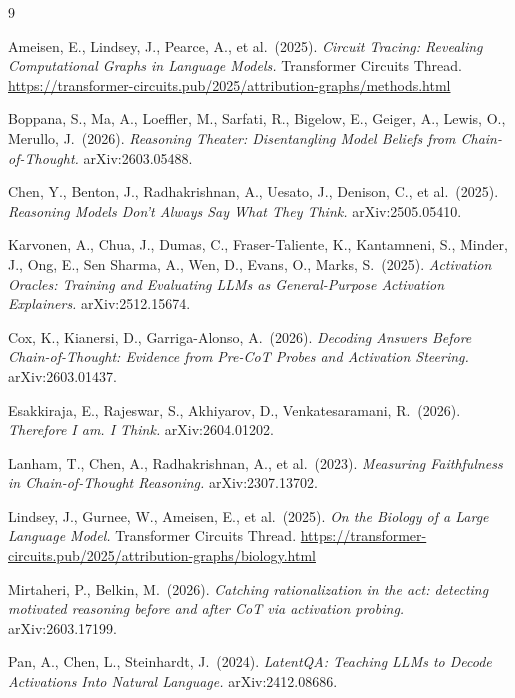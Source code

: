 \documentclass[11pt]{article}
\begin{document}
\begin{thebibliography}{9}

Ameisen, E., Lindsey, J., Pearce, A., et al.\ (2025).
\emph{Circuit Tracing: Revealing Computational Graphs in Language Models.}
Transformer Circuits Thread.
\url{https://transformer-circuits.pub/2025/attribution-graphs/methods.html}

Boppana, S., Ma, A., Loeffler, M., Sarfati, R., Bigelow, E., Geiger, A.,
Lewis, O., Merullo, J.\ (2026). \emph{Reasoning Theater: Disentangling
Model Beliefs from Chain-of-Thought.} arXiv:2603.05488.

Chen, Y., Benton, J., Radhakrishnan, A., Uesato, J., Denison, C., et al.\
(2025). \emph{Reasoning Models Don't Always Say What They Think.}
arXiv:2505.05410.

Karvonen, A., Chua, J., Dumas, C., Fraser-Taliente, K., Kantamneni, S.,
Minder, J., Ong, E., Sen Sharma, A., Wen, D., Evans, O., Marks, S.\
(2025). \emph{Activation Oracles: Training and Evaluating LLMs as
General-Purpose Activation Explainers.} arXiv:2512.15674.

Cox, K., Kianersi, D., Garriga-Alonso, A.\ (2026). \emph{Decoding
Answers Before Chain-of-Thought: Evidence from Pre-CoT Probes and
Activation Steering.} arXiv:2603.01437.

Esakkiraja, E., Rajeswar, S., Akhiyarov, D., Venkatesaramani, R.\ (2026).
\emph{Therefore I am. I Think.} arXiv:2604.01202.

Lanham, T., Chen, A., Radhakrishnan, A., et al.\ (2023).
\emph{Measuring Faithfulness in Chain-of-Thought Reasoning.}
arXiv:2307.13702.

Lindsey, J., Gurnee, W., Ameisen, E., et al.\ (2025).
\emph{On the Biology of a Large Language Model.}
Transformer Circuits Thread.
\url{https://transformer-circuits.pub/2025/attribution-graphs/biology.html}

\bibitem[Mirtaheri and Belkin(2026)]{mirtaheri}
Mirtaheri, P., Belkin, M.\ (2026). \emph{Catching rationalization in the
act: detecting motivated reasoning before and after CoT via activation
probing.} arXiv:2603.17199.

Pan, A., Chen, L., Steinhardt, J.\ (2024). \emph{LatentQA: Teaching LLMs
to Decode Activations Into Natural Language.} arXiv:2412.08686.


\end{thebibliography}
\end{document}
